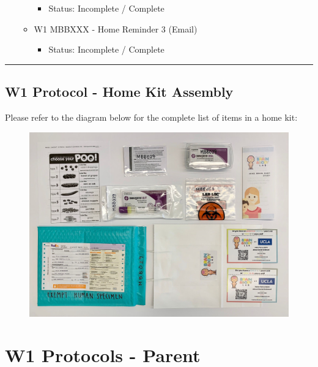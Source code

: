 \documentclass[]{book}
\providecommand{\tightlist}{%
  \setlength{\itemsep}{0pt}\setlength{\parskip}{0pt}}
\begin{document}
\begin{itemize}
\begin{itemize}
    \begin{itemize}
    \tightlist
    \item
      Status: Incomplete / Complete
    \end{itemize}
  \item
    W1 MBBXXX - Home Reminder 3 (Email)

    \begin{itemize}
    \tightlist
    \item
      Status: Incomplete / Complete
    \end{itemize}
  \end{itemize}
\end{itemize}

\begin{center}\rule{0.5\linewidth}{0.5pt}\end{center}

\hypertarget{w1-protocol---home-kit-assembly}{%
\subsection{W1 Protocol - Home Kit Assembly}\label{w1-protocol---home-kit-assembly}}

Please refer to the diagram below for the complete list of items in a home kit:

\begin{figure}
\centering
\includegraphics{images/home_kit/1.jpeg}
\caption{}
\end{figure}

\hypertarget{w1-protocols---parent}{%
\section{W1 Protocols - Parent}\label{w1-protocols---parent}}
\end{document}
